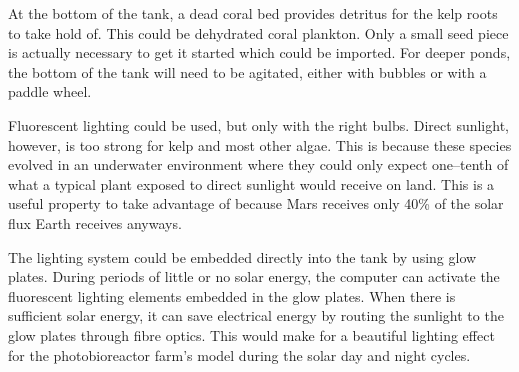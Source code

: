     {}

At the bottom of the tank, a dead coral bed provides detritus for the kelp roots to take hold of. This could be dehydrated coral plankton. Only a small seed piece is actually necessary to get it started which could be imported. For deeper ponds, the bottom of the tank will need to be agitated, either with bubbles or with a paddle wheel.

Fluorescent lighting could be used, but only with the right bulbs. Direct sunlight, however, is too strong for kelp and most other algae. This is because these species evolved in an underwater environment where they could only expect one--tenth of what a typical plant exposed to direct sunlight would receive on land. This is a useful property to take advantage of because Mars receives only 40\% of the solar flux Earth receives anyways. 

The lighting system could be embedded directly into the tank by using glow plates. During periods of little or no solar energy, the computer can activate the fluorescent lighting elements embedded in the glow plates. When there is sufficient solar energy, it can save electrical energy by routing the sunlight to the glow plates through fibre optics. This would make for a beautiful lighting effect for the photobioreactor farm's model during the solar day and night cycles.

